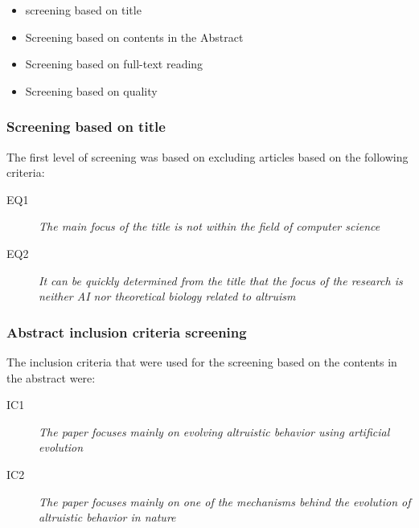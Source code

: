 \documentclass[a4paper]{book}
\begin{document}
				\begin{itemize}

				\item screening based on title
				\item Screening based on contents in the Abstract
				\item Screening based on full-text reading
				\item Screening based on quality

				\end{itemize}

				\subsubsection{Screening based on title}
				The first level of screening was based on excluding articles based on the following criteria:

				\begin{description}
				\item[EQ1] {\it The main focus of the title is not within the field of computer science}
				\item[EQ2] {\it It can be quickly determined from the title that the focus of the research is neither AI nor theoretical biology related to altruism}
				\end{description}


				\subsubsection{Abstract inclusion criteria screening}

				The inclusion criteria that were used for the screening based on the contents in the abstract were:

				\begin{description}
				\item[IC1] {\it The paper focuses mainly on evolving altruistic behavior using artificial evolution}
				\item[IC2] {\it The paper focuses mainly on one of the mechanisms behind the evolution of altruistic behavior in nature}
				\end{description}
\end{document}
